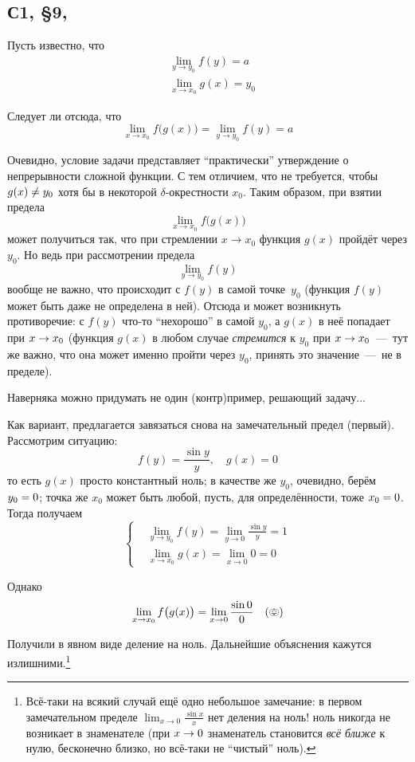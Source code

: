 \documentclass[a4paper,12pt]{article}
\begin{document}
  \subsection{С1, \S 9, }

  Пусть известно, что
  \[
    \begin{aligned}
      &\lim_{y \to y_0} f(y) = a\\
      &\lim_{x \to x_0} g(x) = y_0
    \end{aligned}
  \]

  Следует ли отсюда, что
  \[
    \lim_{x \to x_0} f\bigl(g(x)\bigr) = \lim_{y \to y_0} f(y) = a
  \]
  
  \begin{solution}
    Очевидно, условие задачи представляет ``практически'' утверждение о непрерывности сложной функции.  %
    С тем отличием, что не требуется, чтобы $g(x) \hm{\not=} y_0$ хотя бы в некоторой $\delta$-окрестности $x_0$.
    Таким образом, при взятии предела
    \[
      \lim_{x \to x_0} f\bigl(g(x)\bigr)
    \]
    может получиться так, что при стремлении $x \to x_0$ функция $g(x)$ пройдёт через $y_0$.
    Но ведь при рассмотрении предела
    \[
      \lim_{y \to y_0} f(y)
    \]
    вообще не важно, что происходит с $f(y)$ в самой точке~$y_0$ (функция $f(y)$ может быть даже не определена в ней).
    Отсюда и может возникнуть противоречие: с $f(y)$ что-то ``нехорошо'' в самой $y_0$, а $g(x)$ в неё попадает при $x \hm\to x_0$ (функция $g(x)$ в любом случае \emph{стремится} к $y_0$ при $x \hm\to x_0$~---~тут же важно, что она может именно пройти через $y_0$, принять это значение~---~не в пределе).

    Наверняка можно придумать не один (контр)пример, решающий задачу...

    Как вариант, предлагается завязаться снова на замечательный предел (первый).
    Рассмотрим ситуацию:
    \[
      f(y) = \frac{\sin y}{y}, \quad g(x) = 0
    \]
    то есть $g(x)$ просто константный ноль; в качестве же $y_0$, очевидно, берём $y_0 \hm= 0$;
    точка же $x_0$ может быть любой, пусть, для определённости, тоже $x_0 \hm= 0$.
    Тогда получаем
    \[
      \left\{\begin{aligned}
        &\lim_{y \to y_0} f(y) = \lim_{y \to 0} \frac{\sin y}{y} = 1\\
        &\lim_{x \to x_0} g(x) = \lim_{x \to 0} 0 = 0
      \end{aligned}\right.
    \]

    Однако
    \[
      \lim_{x \to x_0} f\bigl(g(x)\bigr) = \lim_{x \to 0} \frac{\sin 0}{0} \quad (\pumpkin)
    \]

    Получили в явном виде деление на ноль.
    Дальнейшие объяснения кажутся излишними.\footnote{
      Всё-таки на всякий случай ещё одно небольшое замечание: в первом замечательном пределе $\lim_{x \to 0} \frac{\sin x}{x}$ нет деления на ноль! ноль никогда не возникает в знаменателе (при $x \hm\to 0$ знаменатель становится \emph{всё ближе} к нулю, бесконечно близко, но всё-таки не ``чистый'' ноль).
    }
  \end{solution}
\end{document}
